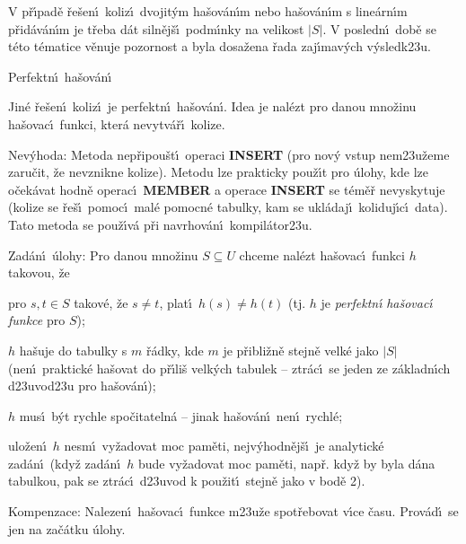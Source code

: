 \flushpar V p\v r\'\i pad\v e \v re\v sen\'\i\ 
koliz\'\i\ dvojit\'ym ha\v sov\'an\'\i m nebo ha\v sov\'an\'\i m s 
line\'arn\'\i m p\v rid\'av\'an\'\i m je t\v reba d\'at siln\v ej\v s\'\i\ podm\'\i nky na velikost $|S|$. V posledn\'\i\ dob\v e se t\'eto t\'ematice 
v\v enuje pozornost a byla dosa\v zena \v rada zaj\'\i mav\'ych v\'ysledk\accent23u.

\heading
Perfektn\'\i\ ha\v sov\'an\'\i
\endheading

\flushpar Jin\'e \v re\v sen\'\i\ koliz\'\i\ je perfektn\'\i\ ha\v sov\'an\'\i . Idea 
je nal\'ezt pro danou mno\v zinu ha\v sovac\'\i\ funkci, kter\'a 
nevytv\'a\v r\'\i\ kolize.
\medskip

\flushpar Nev\'yhoda: Metoda nep\v ripou\v st\'\i\ operaci {\bf INSERT }
(pro nov\'y vstup nem\accent23u\v zeme zaru\v cit, \v ze nevznikne  
kolize). Metodu lze prakticky pou\v z\'\i t pro \'ulohy, kde lze 
o\v cek\'avat hodn\v e operac\'\i\ {\bf MEMBER} a operace {\bf INSERT} se 
t\'em\v e\v r nevyskytuje (kolize se \v re\v s\'\i\ pomoc\'\i\ mal\'e pomocn\'e 
tabulky, kam se ukl\'adaj\'\i\ koliduj\'\i\-c\'\i\ data). Tato metoda se 
pou\v z\'\i v\'a p\v ri navrhov\'an\'\i\ kompil\'ator\accent23u.
\medskip

\flushpar Zad\'an\'\i\ \'ulohy: Pro danou mno\v zinu $S\subseteq 
U$ chceme 
nal\'ezt ha\v so\-va\-c\'\i\ funkci $h$ takovou, \v ze
\roster
\item
pro $s,t\in S$ takov\'e, \v ze $s\ne t$, plat\'\i\ $h\left(s\right)\ne h\left(
t\right)$ (tj. $h$ je \emph{perfektn\'\i} \emph{ha\v sovac\'\i} \emph{funkce} pro 
$S$); 
\item 
$h$ ha\v suje do tabulky s $m$ \v r\'adky, kde $m$ je p\v ribli\v zn\v e 
stejn\v e velk\'e jako $|S|$ (nen\'\i\ praktick\'e ha\v sovat do p\v r\'\i li\v s 
velk\'ych tabulek -- ztr\'ac\'\i\ se jeden ze z\'akladn\'\i ch 
d\accent23uvod\accent23u pro ha\v sov\'an\'\i); 
\item 
$h$ mus\'\i\ b\'yt rychle spo\v citateln\'a -- jinak ha\v sov\'an\'\i\ 
nen\'\i\ rychl\'e;
\item 
ulo\v zen\'\i\ $h$ nesm\'\i\ vy\v zadovat moc pam\v eti, 
nejv\'yhodn\v ej\v s\'\i\ je ana\-lytick\'e zad\'an\'\i\ (kdy\v z zad\'an\'\i\ $
h$ bude 
vy\v zadovat moc pam\v eti, nap\v r. kdy\v z by byla d\'ana tabulkou, 
pak se ztr\'ac\'\i\ d\accent23uvod k pou\v zit\'\i\ stejn\v e jako v 
bod\v e 2).
\endroster


\flushpar Kompenzace: Nalezen\'\i\ ha\v sovac\'\i\ funkce 
m\accent23u\v ze spot\v rebovat v\'\i ce \v casu. Prov\'ad\'\i\ se jen na 
za\v c\'atku \'ulohy. 
\medskip

